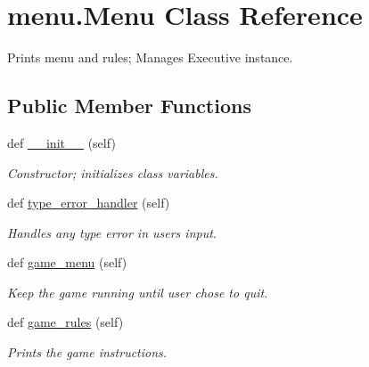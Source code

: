 \hypertarget{classmenu_1_1_menu}{}\section{menu.\+Menu Class Reference}
\label{classmenu_1_1_menu}


Prints menu and rules; Manages Executive instance.  


\subsection*{Public Member Functions}
\begin{DoxyCompactItemize}
\item 
def \mbox{\hyperlink{classmenu_1_1_menu_a8cfc3229464bca830019a5ca722f9649}{\+\_\+\+\_\+init\+\_\+\+\_\+}} (self)
\begin{DoxyCompactList}\small\item\em Constructor; initializes class variables. \end{DoxyCompactList}\item 
def \mbox{\hyperlink{classmenu_1_1_menu_a0215d21cb724dc2843e923476089a5fe}{type\+\_\+error\+\_\+handler}} (self)
\begin{DoxyCompactList}\small\item\em Handles any type error in users input. \end{DoxyCompactList}\item 
def \mbox{\hyperlink{classmenu_1_1_menu_a381788e2ab89d492b6358fc843d41ea1}{game\+\_\+menu}} (self)
\begin{DoxyCompactList}\small\item\em Keep the game running until user chose to quit. \end{DoxyCompactList}\item 
def \mbox{\hyperlink{classmenu_1_1_menu_acd23946f3b85acfc3541b62afd230f17}{game\+\_\+rules}} (self)
\begin{DoxyCompactList}\small\item\em Prints the game instructions. \end{DoxyCompactList}\end{DoxyCompactItemize}
